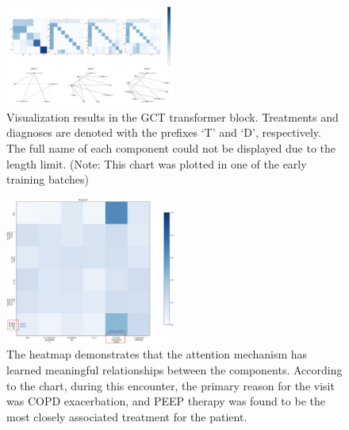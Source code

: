 \documentclass[11pt,a4paper]{article}
\begin{document}
\begin{figure}
    \centering
    \includegraphics[width=0.5\textwidth]{Attention Map.png}
    \caption{Visualization results in the GCT transformer block. Treatments and diagnoses are denoted with the prefixes `T' and `D', respectively. The full name of each component could not be displayed due to the length limit. (Note: This chart was plotted in one of the early training batches)}
    \label{fig:attention-map}
\end{figure}

\begin{figure}
    \centering
    \includegraphics[width=0.5\textwidth]{Attention Map2.png}
    \caption{The heatmap demonstrates that the attention mechanism has learned meaningful relationships between the components. According to the chart,  during this encounter, the primary reason for the visit was COPD exacerbation, and PEEP therapy was found to be the most closely associated treatment for the patient.}
    \label{fig:attention-map2}
\end{figure}
\end{document}
